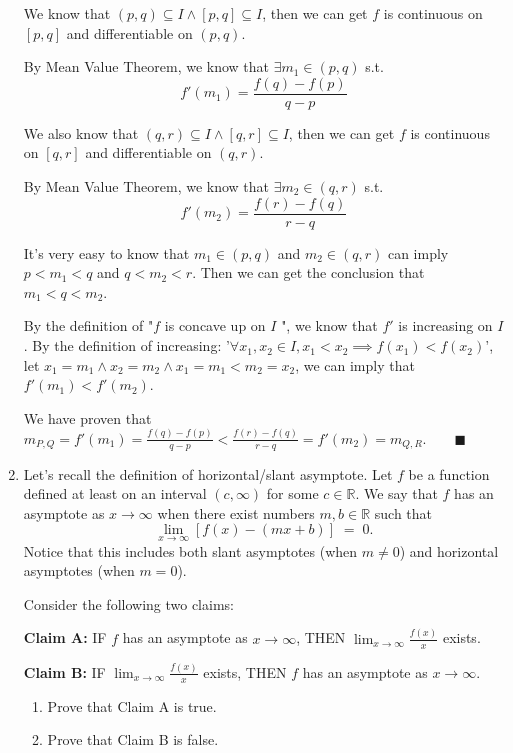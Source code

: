 \documentclass[12pt]{exam}
\newcommand {\DS} [1] {${\displaystyle #1}$}
\newcommand{\R}{\mathbb{R}}
\begin{document}
\begin{enumerate}
We know that $(p,q)\subseteq I \land [p,q]\subseteq I$, then we can get $f$ is continuous on $[p,q]$ and differentiable on $(p,q)$.

By Mean Value Theorem, we know that $\exists m_1\in(p,q)$ s.t.
$$
    f'(m_1)=\frac{f(q)-f(p)}{q-p}
$$

We also know that $(q,r)\subseteq I \land [q,r]\subseteq I$, then we can get $f$ is continuous on $[q,r]$ and differentiable on $(q,r)$.

By Mean Value Theorem, we know that $\exists m_2\in(q,r)$ s.t.
$$
    f'(m_2)=\frac{f(r)-f(q)}{r-q}
$$

It's very easy to know that $m_1\in(p,q)$ and $m_2\in(q,r)$ can imply $p<m_1<q$ and $q<m_2<r$. Then we can get the conclusion that $m_1<q<m_2$.

By the definition of "$f$ is concave up on $I$ ", we know that $f'$ is increasing on $I$. By the definition of increasing: '$\forall x_1, x_2\in I, x_1<x_2 \implies f(x_1)<f(x_2)$', let $x_1=m_1 \land x_2=m_2 \land x_1=m_1<m_2=x_2$, we can imply that $f'(m_1)<f'(m_2)$.

We have proven that $m_{P,Q}=f'(m_1)=\frac{f(q)-f(p)}{q-p} < \frac{f(r)-f(q)}{r-q}=f'(m_2)=m_{Q,R}. \qquad\blacksquare$

\newpage

\item  Let's recall the definition of horizontal/slant asymptote.  Let $f$ be a function defined at least on an interval $(c,\infty)$ for some $c \in \R$.
We say that $f$ has an asymptote as $x \to \infty$ when there exist numbers $m, b \in \R$ such that
	$$	
		\lim_{x \to \infty} \left[ f(x) - \left( mx + b \right) \right] \; = \; 0.
	$$
Notice that this includes both slant asymptotes (when $m \neq 0$) and horizontal asymptotes (when $m =0$).
	
Consider the following two claims:	
			\begin{center}
				{\bf Claim A:} \quad \quad
					IF $f$ has an asymptote as $x \to \infty$,  \quad
					THEN \DS{\lim_{x \to \infty} \frac{f(x)}{x}} exists.
				
				{\bf Claim B:} \quad \quad 		
					IF \DS{\lim_{x \to \infty} \frac{f(x)}{x}} exists, \quad
					THEN $f$ has an asymptote as $x \to \infty$.
			\end{center}
	\begin{enumerate}
		\item Prove that Claim A is true.
		\item Prove that Claim B is false.


\end{enumerate}
\end{enumerate}
\end{document}
